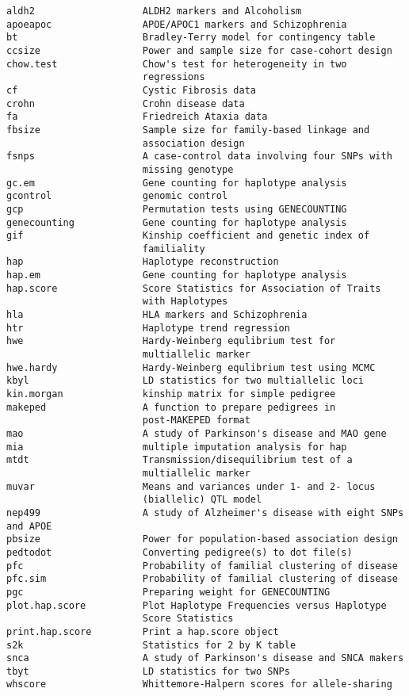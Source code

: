 \documentclass[11pt,a4paper]{article}
\begin{document}
\begin{verbatim}
aldh2                   ALDH2 markers and Alcoholism
apoeapoc                APOE/APOC1 markers and Schizophrenia
bt                      Bradley-Terry model for contingency table
ccsize                  Power and sample size for case-cohort design
chow.test               Chow's test for heterogeneity in two
                        regressions
cf                      Cystic Fibrosis data
crohn                   Crohn disease data
fa                      Friedreich Ataxia data
fbsize                  Sample size for family-based linkage and
                        association design
fsnps                   A case-control data involving four SNPs with
                        missing genotype
gc.em                   Gene counting for haplotype analysis
gcontrol                genomic control
gcp                     Permutation tests using GENECOUNTING
genecounting            Gene counting for haplotype analysis
gif                     Kinship coefficient and genetic index of
                        familiality
hap                     Haplotype reconstruction
hap.em                  Gene counting for haplotype analysis
hap.score               Score Statistics for Association of Traits
                        with Haplotypes
hla                     HLA markers and Schizophrenia
htr                     Haplotype trend regression
hwe                     Hardy-Weinberg equlibrium test for
                        multiallelic marker
hwe.hardy               Hardy-Weinberg equlibrium test using MCMC
kbyl                    LD statistics for two multiallelic loci
kin.morgan              kinship matrix for simple pedigree
makeped                 A function to prepare pedigrees in
                        post-MAKEPED format
mao                     A study of Parkinson's disease and MAO gene
mia                     multiple imputation analysis for hap
mtdt                    Transmission/disequilibrium test of a
                        multiallelic marker
muvar                   Means and variances under 1- and 2- locus
                        (biallelic) QTL model
nep499                  A study of Alzheimer's disease with eight SNPs and APOE
pbsize                  Power for population-based association design
pedtodot                Converting pedigree(s) to dot file(s)
pfc                     Probability of familial clustering of disease
pfc.sim                 Probability of familial clustering of disease
pgc                     Preparing weight for GENECOUNTING
plot.hap.score          Plot Haplotype Frequencies versus Haplotype
                        Score Statistics
print.hap.score         Print a hap.score object
s2k                     Statistics for 2 by K table
snca                    A study of Parkinson's disease and SNCA makers
tbyt                    LD statistics for two SNPs
whscore                 Whittemore-Halpern scores for allele-sharing
\end{verbatim}
\end{document}
